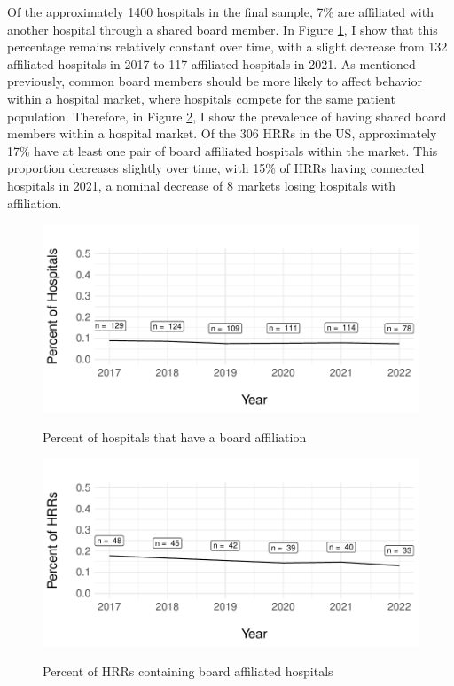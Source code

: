 \documentclass[12pt]{article}
\begin{document}
    Of the approximately 1400 hospitals in the final sample, 7\% are affiliated with another hospital through a shared board member. In Figure \ref{fig:connected_percent}, I show that this percentage remains relatively constant over time, with a slight decrease from 132 affiliated hospitals in 2017 to 117 affiliated hospitals in 2021. As mentioned previously, common board members should be more likely to affect behavior within a hospital market, where hospitals compete for the same patient population. Therefore, in Figure \ref{fig:connected_HRR_percent}, I show the prevalence of having shared board members within a hospital market. Of the 306 HRRs in the US, approximately 17\% have at least one pair of board affiliated hospitals within the market. This proportion decreases slightly over time, with 15\% of HRRs having connected hospitals in 2021, a nominal decrease of 8 markets losing hospitals with affiliation. 


    \begin{figure}[ht!]
        \centering
        \vspace{9mm}
        \caption{Percent of hospitals that have a board affiliation}
        \includegraphics[width=.8\textwidth]{Objects/connected_percent.pdf}
        \label{fig:connected_percent}
    \end{figure}


    \begin{figure}[ht!]
        \centering
        \caption{Percent of HRRs containing board affiliated hospitals}
        \includegraphics[width=.8\textwidth]{Objects/connected_HRR_percent.pdf}
        \label{fig:connected_HRR_percent}
    \end{figure}
\end{document}
